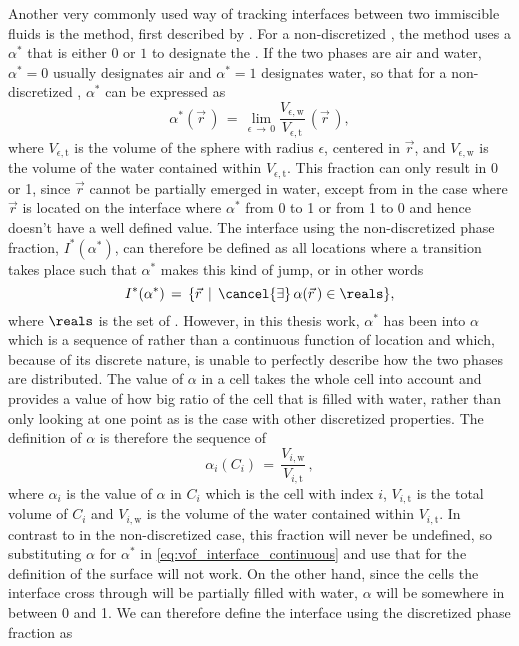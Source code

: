 Another very commonly used way of tracking interfaces between two immiscible fluids is the \VOF method, first described by \citet{Hirt1981}. For a non-discretized \PDE, the \VOF method uses a  $\alpha^*$ that is either $0$ or $1$ to designate the \phase. If the two phases are air and water, $\alpha^* = 0$ usually designates air and $\alpha^* = 1$ designates water, so that for a non-discretized \PDE, $\alpha^*$ can be expressed as
%
\begin{equation} \label{eq:phase_fraction_continuous}
\alpha^*(\vec{r}\,) \,=\, \lim_{\epsilon\,\rightarrow\,0} \frac{V_{\epsilon,\text{w}}}{V_{\epsilon,\text{t}}}\,(\vec{r}\,),
\end{equation}
%
where $V_{\epsilon,\text{t}}$ is the volume of the sphere with radius $\epsilon$, centered in $\vec{r}$, and $V_{\epsilon,\text{w}}$ is the volume of the water contained within $V_{\epsilon,\text{t}}$. This fraction can only result in 0 or 1, since $\vec{r}$ cannot be partially emerged in water, except from in the case where $\vec{r}$ is located on the interface where $\alpha^*$  from 0 to 1 or from 1 to 0 and hence doesn't have a well defined value. The interface using the non-discretized phase fraction, $I^*(\alpha^*)$, can therefore be defined as all locations where a transition takes place such that $\alpha^*$ makes this kind of jump, or in other words
%
\begin{equation} \label{eq:vof_interface_continuous}
I^*(\alpha^*) \,=\, \{\vec{r} \,\mid\, \cancel{\exists}\,\alpha(\vec{r}\,)\in\reals\},
\end{equation}
%
where $\reals$ is the set of . However, in this thesis work, $\alpha^*$ has been \discretized into $\alpha$ which is a sequence of  rather than a continuous function of location and which, because of its discrete nature, is unable to perfectly describe how the two phases are distributed. The value of $\alpha$ in a cell takes the whole cell into account and provides a value of how big ratio of the cell that is filled with water, rather than only looking at one point as is the case with other discretized properties. The definition of $\alpha$ is therefore the sequence of
%
\begin{equation} \label{eq:phase_fraction_discretized}
\alpha_i(C_i) \,=\, \frac{V_{i,\text{w}}}{V_{i,\text{t}}}\,,
\end{equation}
%
where $\alpha_i$ is the value of $\alpha$ in $C_i$ which is the cell with index $i$, $V_{i,\text{t}}$ is the total volume of $C_i$ and $V_{i,\text{w}}$ is the volume of the water contained within $V_{i,\text{t}}$. In contrast to in the non-discretized case, this fraction will never be undefined, so substituting $\alpha$ for $\alpha^*$ in \eqref{eq:vof_interface_continuous} and use that for the definition of the surface will not work. On the other hand, since the cells the interface cross through will be partially filled with water, $\alpha$ will be somewhere in between 0 and 1. We can therefore define the interface using the discretized phase fraction as
